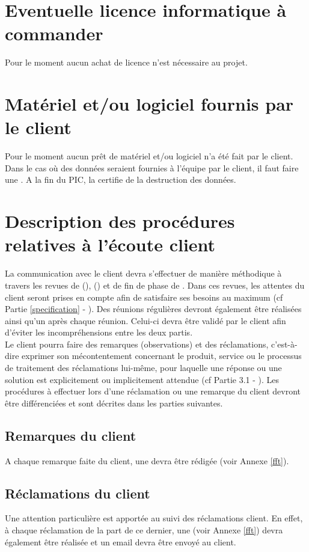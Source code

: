 \section{Eventuelle licence informatique à commander}
\label{Eventuelle licence informatique à commander}
\indent Pour le moment aucun achat de licence n'est nécessaire au projet.

\section{Matériel et/ou logiciel fournis par le client}
\label{Matériel et/ou logiciel fournis par le client}
\indent Pour le moment aucun prêt de matériel et/ou logiciel n'a été fait par le client.\\
\indent Dans le cas où des données seraient fournies à l’équipe \PICCourt par le client, il faut faire une \FEDC. A la fin du PIC, la \FEDCCourt certifie de la destruction des données.

\section{Description des procédures relatives à l'écoute client}
\label{DescrProceduresRelativesALecouteClient}
\indent La communication avec le client devra s'effectuer de manière méthodique à travers les revues de \DSI{} (\DSICourt), \DSE{} (\DSECourt) et de fin de phase de \PICCourt. Dans ces revues, les attentes du client seront prises en compte afin de satisfaire ses besoins au maximum (cf Partie \ref{specification} - \PQCourt). Des réunions régulières devront également être réalisées ainsi qu'un \CRC{} après chaque réunion. Celui-ci devra être validé par le client afin d'éviter les incompréhensions entre les deux partis. \\
Le client pourra faire des remarques (observations) et des réclamations, c'est-à-dire exprimer son mécontentement concernant le produit, service ou le processus de traitement des réclamations lui-même, pour laquelle une réponse ou une solution est explicitement ou implicitement attendue (cf Partie 3.1 - \MQ). 
Les procédures à effectuer lors d'une réclamation ou une remarque du client devront être différenciées et sont décrites dans les parties suivantes.
   
\subsection{Remarques du client}
\label{RqClient}
A chaque remarque faite du client, une \FFT{} devra être rédigée (voir Annexe \ref{fft}).

\subsection{Réclamations du client}
\label{ReclamClient}
Une attention particulière est apportée au suivi des réclamations client. En effet, à chaque réclamation de la part de ce dernier, une \FFT{} (voir Annexe \ref{fft}) devra également être réalisée et un email devra être envoyé au client. 

